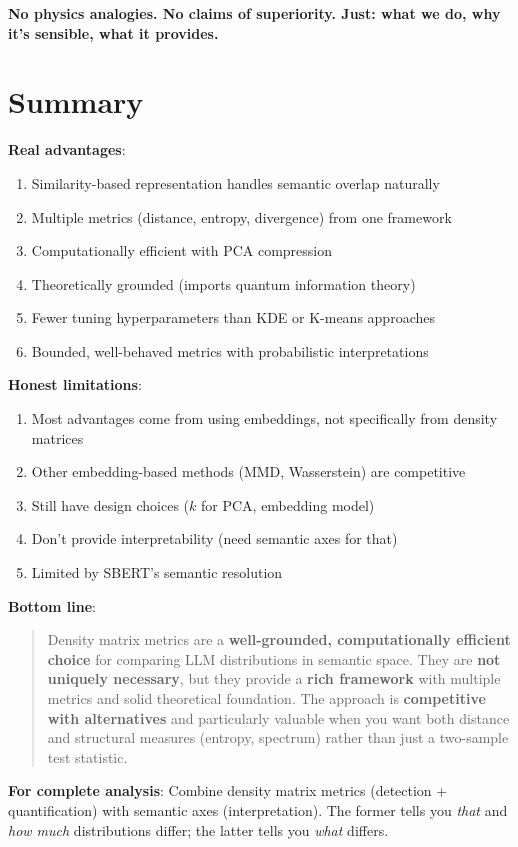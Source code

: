 \documentclass[11pt]{article}
\newcommand{\cmark}{✓}
\newcommand{\wmark}{⚠}
\begin{document}
\textbf{No physics analogies. No claims of superiority. Just: what we do, why it's sensible, what it provides.}

\section{Summary}

\textbf{Real advantages}:
\begin{enumerate}
\item[\cmark] Similarity-based representation handles semantic overlap naturally
\item[\cmark] Multiple metrics (distance, entropy, divergence) from one framework
\item[\cmark] Computationally efficient with PCA compression
\item[\cmark] Theoretically grounded (imports quantum information theory)
\item[\cmark] Fewer tuning hyperparameters than KDE or K-means approaches
\item[\cmark] Bounded, well-behaved metrics with probabilistic interpretations
\end{enumerate}

\textbf{Honest limitations}:
\begin{enumerate}
\item[\wmark] Most advantages come from using embeddings, not specifically from density matrices
\item[\wmark] Other embedding-based methods (MMD, Wasserstein) are competitive
\item[\wmark] Still have design choices ($k$ for PCA, embedding model)
\item[\wmark] Don't provide interpretability (need semantic axes for that)
\item[\wmark] Limited by SBERT's semantic resolution
\end{enumerate}

\textbf{Bottom line}:
\begin{quote}
Density matrix metrics are a \textbf{well-grounded, computationally efficient choice} for comparing LLM distributions in semantic space. They are \textbf{not uniquely necessary}, but they provide a \textbf{rich framework} with multiple metrics and solid theoretical foundation. The approach is \textbf{competitive with alternatives} and particularly valuable when you want both distance and structural measures (entropy, spectrum) rather than just a two-sample test statistic.
\end{quote}

\textbf{For complete analysis}: Combine density matrix metrics (detection + quantification) with semantic axes (interpretation). The former tells you \textit{that} and \textit{how much} distributions differ; the latter tells you \textit{what} differs.
\end{document}
